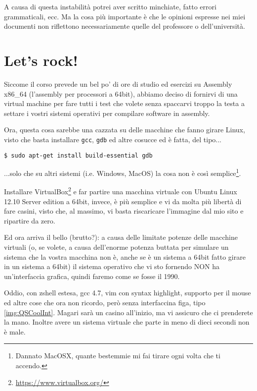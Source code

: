 \documentclass[a4paper]{memoir}
\begin{document}
		A causa di questa instabilità potrei aver scritto minchiate, fatto errori
		grammaticali, ecc. Ma la cosa più
		importante è che le opinioni espresse nei miei documenti non riflettono
		necessariamente quelle del professore o dell'università.

\chapter{Let's rock!}

	Siccome il corso prevede un bel po' di ore di studio ed esercizi su Assembly x86\_{}64
	(l'assembly per processori a 64bit), abbiamo deciso di fornirvi di una virtual
	machine per fare tutti i test che volete senza spaccarvi troppo la testa a settare
	i vostri sistemi operativi per compilare software in assembly.
	
	Ora, questa cosa sarebbe una cazzata su delle macchine che fanno girare Linux, visto
	che basta installare \texttt{gcc}, \texttt{gdb} ed altre cosucce ed è fatta, del tipo...
	
	\begin{Verbatim}[label=È tutto più semplice con linux quando si parla di programmazione]
$ sudo apt-get install build-essential gdb
	\end{Verbatim}
	
	...solo che su altri sistemi (i.e. Windows, MacOS) la cosa non è così semplice\footnote{Dannato
	MacOSX, quante bestemmie mi fai tirare ogni volta che ti accendo.}.
	
	Installare VirtualBox\footnote{\url{https://www.virtualbox.org/}} e far partire una macchina
	virtuale con Ubuntu Linux 12.10 Server edition
	a 64bit, invece, è più semplice e vi da molta più libertà di fare casini, visto che, al massimo,
	vi basta riscaricare l'immagine dal mio sito e ripartire da zero.
	
	Ed ora arriva il bello (brutto?): a causa delle limitate potenze delle macchine virtuali
	(o, se volete, a causa dell'enorme potenza buttata per simulare un sistema che la vostra macchina
	non è, anche se è un sistema a 64bit fatto girare in un sistema a 64bit) il sistema
	operativo che vi sto fornendo NON ha un'interfaccia grafica, quindi faremo come se fosse il 1990.
	
	Oddio, con zshell estesa, gcc 4.7, vim con syntax highlight, supporto per il mouse ed altre cose
	che ora non ricordo, però senza interfaccina figa, tipo \ref{img:QSCoolInt}. Magari sarà un casino
	all'inizio, ma vi assicuro che ci prenderete la mano. Inoltre avere un sistema virtuale che parte
	in meno di dieci secondi non è male.
	
\end{document}
